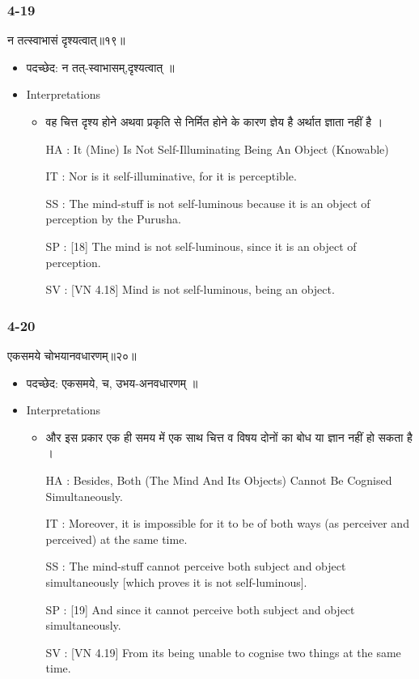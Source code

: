 \begin{frame}[fragile]\frametitle{4-19}
\begin{sanskrit}
न तत्स्वाभासं दृश्यत्वात्॥१९॥
\end{sanskrit}

	\begin{itemize}
	\item पदच्छेद:  ‌न तत्-स्वाभासम्,दृश्यत्वात् ॥
	\item Interpretations
		\begin{itemize}	
		\item  वह चित्त दृश्य होने अथवा प्रकृति से निर्मित होने के कारण ज्ञेय है अर्थात ज्ञाता नहीं है ।
		\item [HA]: It (Mine) Is Not Self-Illuminating Being An Object (Knowable)
		\item [IT]: Nor is it self-illuminative, for it is perceptible.
		\item [SS]: The mind-stuff is not self-luminous because it is an object of perception by the Purusha.
		\item [SP]: [18] The mind is not self-luminous, since it is an object of perception.
		\item [SV]: [VN 4.18] Mind is not self-luminous, being an object. 
		\end{itemize}
	\end{itemize}
\end{frame}

\begin{frame}[fragile]\frametitle{4-20}
\begin{sanskrit}
एकसमये चोभयानवधारणम्॥२०॥
\end{sanskrit}

	\begin{itemize}
	\item पदच्छेद: एकसमये, च, उभय-अनवधारणम् ॥
	\item Interpretations
		\begin{itemize}	
		\item और इस प्रकार एक ही समय में एक साथ चित्त व विषय दोनों का बोध या ज्ञान नहीं हो सकता है ।
		\item [HA]: Besides, Both (The Mind And Its Objects) Cannot Be Cognised Simultaneously.
		\item [IT]: Moreover, it is impossible for it to be of both ways (as perceiver and perceived) at the same time.
		\item [SS]: The mind-stuff cannot perceive both subject and object simultaneously [which proves it is not self-luminous].
		\item [SP]: [19] And since it cannot perceive both subject and object simultaneously.
		\item [SV]: [VN 4.19] From its being unable to cognise two things at the same time. 
		\end{itemize}
	\end{itemize}
\end{frame}


